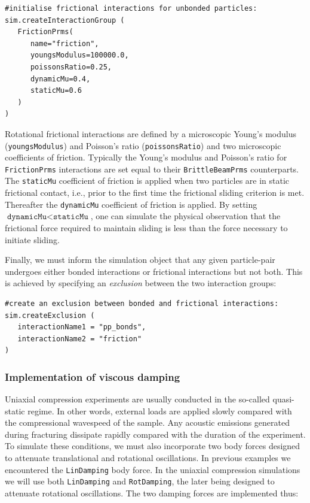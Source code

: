 \begin{verbatim}
#initialise frictional interactions for unbonded particles:
sim.createInteractionGroup (
   FrictionPrms(
      name="friction",
      youngsModulus=100000.0,
      poissonsRatio=0.25,
      dynamicMu=0.4,
      staticMu=0.6
   )
)
\end{verbatim}

\noindent
Rotational frictional interactions are defined by a microscopic Young's modulus (\texttt{youngs\+Mod\+u\+lus}) and Poisson's ratio (\texttt{poissonsRatio}) and two microscopic coefficients of friction. Typically the Young's modulus and Poisson's ratio for \texttt{FrictionPrms} interactions are set equal to their \texttt{BrittleBeamPrms} counterparts. The \texttt{staticMu} coefficient of friction is applied when two particles are in static frictional contact, i.e., prior to the first time the frictional sliding criterion is met. Thereafter the \texttt{dynamicMu} coefficient of friction is applied. By setting $\texttt{dynamicMu} < \texttt{staticMu}$, one can simulate the physical observation that the frictional force required to maintain sliding is less than the force necessary to initiate sliding.

Finally, we must inform the simulation object that any given particle-pair undergoes either bonded interactions or frictional interactions but not both. This is achieved by specifying an \emph{exclusion} between the two interaction groups:

\begin{verbatim}
#create an exclusion between bonded and frictional interactions:
sim.createExclusion (
   interactionName1 = "pp_bonds",
   interactionName2 = "friction"
)
\end{verbatim}

\subsubsection{Implementation of viscous damping}

Uniaxial compression experiments are usually conducted in the so-called quasi-static regime. In other words, external loads are applied slowly compared with the compressional wavespeed of the sample. Any acoustic emissions generated during fracturing dissipate rapidly compared with the duration of the experiment. To simulate these conditions, we must also incorporate two body forces designed to attenuate translational and rotational oscillations. In previous examples we encountered the \texttt{LinDamping} body force. In the uniaxial compression simulations we will use both \texttt{LinDamping} and \texttt{RotDamping}, the later being designed to attenuate rotational oscillations. The two damping forces are implemented thus:

